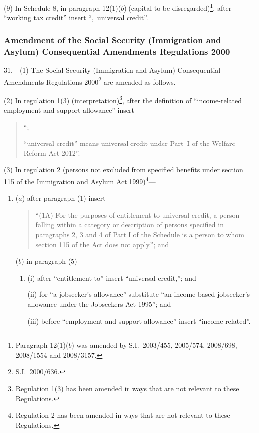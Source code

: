 \documentclass[12pt,a4paper]{article}
\begin{document}
(9) In Schedule 8, in paragraph 12(1)($b$) (capital to be disregarded)\footnote{Paragraph 12(1)($b$) was amended by S.I.~2003/455, 2005/574, 2008/698, 2008/1554 and 2008/3157.}, after “working tax credit” insert “,~universal credit”.

\subsubsection[31. Amendment of the Social Security (Immigration and Asylum) Consequential Amendments Regulations 2000]{Amendment of the Social Security (Immigration and Asylum) Consequential Amendments Regulations 2000}

31.—(1) The Social Security (Immigration and Asylum) Consequential Amendments Regulations 2000\footnote{S.I.~2000/636.} are amended as follows.

(2) In regulation 1(3) (interpretation)\footnote{Regulation 1(3) has been amended in ways that are not relevant to these Regulations.}, after the definition of “income-related employment and support allowance” insert—
\begin{quotation}
“;

“universal credit” means universal credit under Part~I of the Welfare Reform Act 2012”.
\end{quotation}

(3) In regulation 2 (persons not excluded from specified benefits under section 115 of the Immigration and Asylum Act 1999)\footnote{Regulation 2 has been amended in ways that are not relevant to these Regulations.}—
\begin{enumerate}\item[]
($a$) after paragraph (1) insert—
\begin{quotation}
“(1A) For the purposes of entitlement to universal credit, a person falling within a category or description of persons specified in paragraphs 2, 3 and 4 of Part I of the Schedule is a person to whom section 115 of the Act does not apply.”; and
\end{quotation}

($b$) in paragraph (5)—
\begin{enumerate}\item[]
(i) after “entitlement to” insert “universal credit,”; and

(ii) for “a jobseeker’s allowance” substitute “an income-based jobseeker’s allowance under the Jobseekers Act 1995”; and

(iii) before “employment and support allowance” insert “income-related”.
\end{enumerate}
\end{enumerate}
\end{document}
